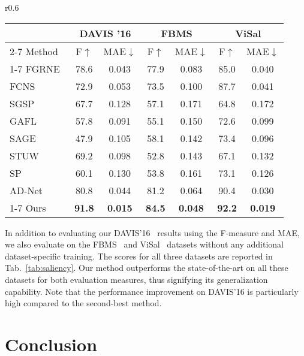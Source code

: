 \documentclass{bmvc2k}
\begin{document}
\begin{wraptable}{r}{0.6\textwidth}
\vspace{-5mm}
\footnotesize
\setlength{\tabcolsep}{4pt} \centering
{}
\begin{tabular}{l|cc |cc|cc}
\toprule
 &\multicolumn{2}{c|}{DAVIS '16} & \multicolumn{2}{c|}{FBMS} & \multicolumn{2}{c}{ViSal} \\
 \cmidrule(lr){2-7}
 Method & F$\uparrow$ & MAE$\downarrow$ & F$\uparrow$ & MAE$\downarrow$ & F$\uparrow$ & MAE$\downarrow$ \\
\cmidrule(lr){1-7}
FGRNE~\cite{Li18CVPR} & 78.6 & 0.043 & 77.9 & 0.083& 85.0 & 0.040\\ 
FCNS~\cite{Wang17TIP} & 72.9 & 0.053& 73.5& 0.100& 87.7& 0.041 \\
SGSP~\cite{Liu16TCSVT} & 67.7& 0.128& 57.1&  0.171& 64.8&  0.172 \\
GAFL~\cite{Wang15TIP} & 57.8 & 0.091& 55.1&  0.150& 72.6&  0.099 \\
SAGE~\cite{Wang15CVPR} & 47.9& 0.105& 58.1&  0.142& 73.4&  0.096 \\
STUW~\cite{Fang14TIP} & 69.2& 0.098& 52.8&  0.143& 67.1& 0.132\\
SP~\cite{Liu14TCSVT}   & 60.1&0.130&53.8&0.161&73.1&0.126\\
AD-Net~\cite{Yang19ICCVAnchorDiff} & 80.8 &0.044  &81.2 & 0.064  &90.4 &0.030 \\
\cmidrule(lr){1-7}
Ours&  \textbf{91.8} &\textbf{0.015}& \textbf{84.5} & \textbf{0.048} & \textbf{92.2} & \textbf{0.019}\\
\bottomrule
\end{tabular}
\caption{\label{tab:evaltable2} F-measure and MAE for DAVIS, FBMS and ViSal datasets. $\uparrow$: Higher is better, $\downarrow$: Lower is better.}
\label{tab:saliency}
\vspace{-2mm}
\end{wraptable} 
In addition to evaluating our DAVIS'16~\cite{PontTuset17arxiv} results using the F-measure and MAE, we also evaluate on the FBMS~\cite{Ochs13TPAMI} and ViSal~\cite{Wang15TIP} datasets without any additional dataset-specific training. The scores for all three datasets are reported in Tab.~\ref{tab:saliency}. Our method outperforms the state-of-the-art on all these datasets for both evaluation measures, thus signifying its generalization capability. Note that the performance improvement on DAVIS'16 is particularly high compared to the second-best method.
 
\section{Conclusion}
\end{document}
